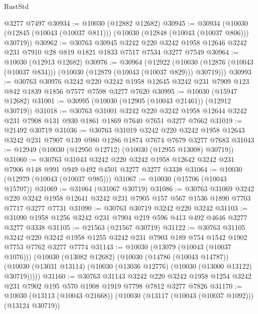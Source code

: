 \begin{lexlean}{RustStd}
\begin{coremodule}
    @3277
    @7497
@30934 := @10030 (@12882 @12682)
@30945 := @30934
    (@10030 (@12845 (@10043 (@10037 @811))) (@10030 (@12848 (@10043 (@10037 @806))) @30719))
@30962 := @30763
    @30945
    @3242
    @220
    @3242
    @1958
    @12646
    @3242
    @231
    @7910
    @28
    @819
    @1821
    @1833
    @7517
    @7534
    @3277
    @7549
@30964 := @10030 (@12913 @12682)
@30976 := @30964
    (@12922
      (@10030 (@12876 (@10043 (@10037 @834))) (@10030 (@12879 (@10043 (@10037 @829))) @30719)))
@30993 := @30763
    @30976
    @3242
    @220
    @3242
    @1958
    @12645
    @3242
    @231
    @7909
    @123
    @842
    @1839
    @1856
    @7577
    @7598
    @3277
    @7620
@30995 := @10030 (@15947 @12682)
@31001 := @30995 (@10030 (@12905 (@10043 @21461)) (@12912 @30719))
@31018 := @30763
    @31001
    @3242
    @220
    @3242
    @1958
    @12644
    @3242
    @231
    @7908
    @131
    @930
    @1861
    @1869
    @7640
    @7651
    @3277
    @7662
@31019 := @21492 @30719
@31036 := @30763
    @31019
    @3242
    @220
    @3242
    @1958
    @12643
    @3242
    @231
    @7907
    @139
    @980
    @1286
    @1874
    @7674
    @7679
    @3277
    @7683
@31043 := @12949 (@10030 (@12950 @12712) (@10030 (@12955 @13008) @30719))
@31060 := @30763
    @31043
    @3242
    @220
    @3242
    @1958
    @12642
    @3242
    @231
    @7906
    @148
    @991
    @949
    @492
    @4501
    @3277
    @3277
    @3338
@31064 := @10030 (@12979 (@10043 (@10037 @985)))
@31067 := @10030 (@15706 (@10043 @15707))
@31069 := @31064 (@31067 @30719)
@31086 := @30763
    @31069
    @3242
    @220
    @3242
    @1958
    @12641
    @3242
    @231
    @7905
    @157
    @567
    @1536
    @1890
    @7703
    @7717
    @3277
    @7731
@31090 := @30763 @30719 @3242 @220 @3242
@31103 := @31090 @1958 @1256 @3242 @231 @7904 @219 @596 @413 @492 @4646 @3277 @3277 @3338
@31105 := @21563 (@21567 @30719)
@31122 := @30763
    @31105
    @3242
    @220
    @3242
    @1958
    @1255
    @3242
    @231
    @7903
    @189
    @754
    @1542
    @1902
    @7753
    @7762
    @3277
    @7774
@31143 := @10030
    (@13079 (@10043 (@10037 @1076)))
    (@10030
      (@13082 @12682)
      (@10030
        (@14786 (@10043 @14787))
        (@10030 (@13031 @13114) (@10030 (@13036 @12776) (@10030 (@13000 @13122) @30719)))))
@31160 := @30763
    @31143
    @3242
    @220
    @3242
    @1958
    @1254
    @3242
    @231
    @7902
    @195
    @570
    @1908
    @1919
    @7798
    @7812
    @3277
    @7826
@31170 := @10030 (@13113 (@10043 @21668)) (@10030 (@13117 (@10043 (@10037 @1092))) (@13124 @30719))

\end{coremodule}
\end{lexlean}

